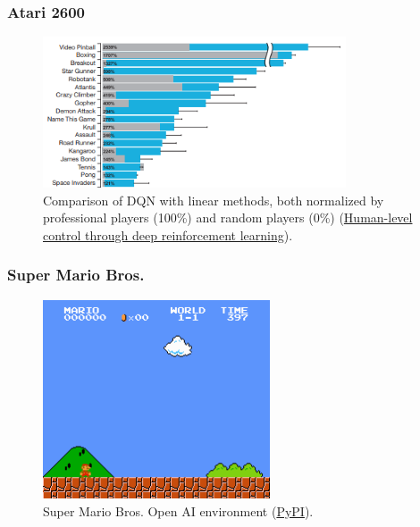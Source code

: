 \documentclass{beamer}
\begin{document}
        \begin{frame}
            \frametitle{Atari 2600}
            
            \begin{figure}[]
                \centering
                \includegraphics[width=0.8\textwidth]{figures/comparison2}
                \caption{Comparison of DQN with linear methods, both normalized by professional players (100\%) and random players (0\%) (\href{https://storage.googleapis.com/deepmind-data/assets/papers/DeepMindNature14236Paper.pdf}{Human-level control through deep reinforcement learning}).}
                \label{fig15:atari}
            \end{figure}
        
        \end{frame}

        \begin{frame}
            \frametitle{Super Mario Bros.}
        
            \begin{figure}
                \centering
                \includegraphics[width=0.6\textwidth]{figures/super_mario_bros.png}
                \caption{Super Mario Bros. Open AI environment (\href{https://pypi.org/project/gym-super-mario-bros/}{PyPI}).}
                \label{fig13:mario}
            \end{figure}
        
        \end{frame}
\end{document}
